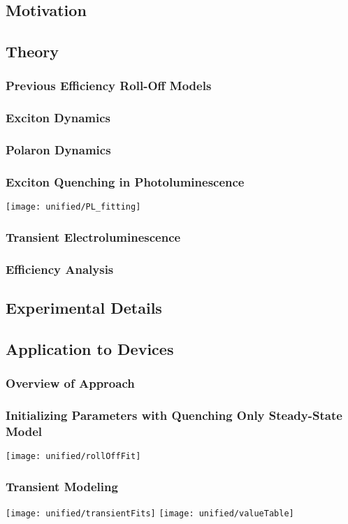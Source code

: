 \documentclass[../thesis.tex]{subfiles}
\begin{document}
\subsection{Motivation}
\subsection{Theory}
\subsubsection{Previous Efficiency Roll-Off Models}
\subsubsection{Exciton Dynamics}
\subsubsection{Polaron Dynamics}
\subsubsection{Exciton Quenching in Photoluminescence}
\texttt{[image: unified/PL\_fitting]}
\subsubsection{Transient Electroluminescence}
\subsubsection{Efficiency Analysis}
\subsection{Experimental Details}
\subsection{Application to Devices}
\subsubsection{Overview of Approach}
\subsubsection{Initializing Parameters with Quenching Only Steady-State Model}
\texttt{[image: unified/rollOffFit]}
\subsubsection{Transient Modeling}
\texttt{[image: unified/transientFits]}
\texttt{[image: unified/valueTable]}
\end{document}
